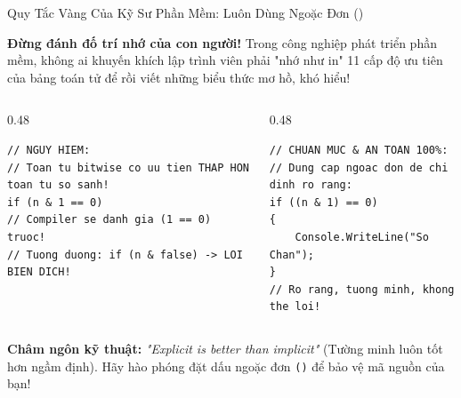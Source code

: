 \documentclass[aspectratio=169, 10pt]{beamer}
\begin{document}
\begin{frame}[fragile]{Quy Tắc Vàng Của Kỹ Sư Phần Mềm: Luôn Dùng Ngoặc Đơn ()}
  \begin{alertblock}{\textbf{Đừng đánh đố trí nhớ của con người!}}
    Trong công nghiệp phát triển phần mềm, không ai khuyến khích lập trình viên phải "nhớ như in" 11 cấp độ ưu tiên của bảng toán tử để rồi viết những biểu thức mơ hồ, khó hiểu!
  \end{alertblock}

  \begin{columns}[T]
    \begin{column}{0.48\textwidth}
      \begin{tcolorbox}[colback=AlertRed!10,colframe=AlertRed,title=\textbf{Biểu thức thiếu ngoặc (Code Smell - Dễ lỗi)},fonttitle=\small\bfseries]
\begin{lstlisting}[numbers=none]
// NGUY HIEM:
// Toan tu bitwise co uu tien THAP HON toan tu so sanh!
if (n & 1 == 0) 
// Compiler se danh gia (1 == 0) truoc!
// Tuong duong: if (n & false) -> LOI BIEN DICH!
\end{lstlisting}
      \end{tcolorbox}
    \end{column}

    \begin{column}{0.48\textwidth}
      \begin{tcolorbox}[colback=UniGreen!10,colframe=UniGreen,title=\textbf{Biểu thức dùng ngoặc đơn (Chuẩn mực)},fonttitle=\small\bfseries]
\begin{lstlisting}[numbers=none]
// CHUAN MUC & AN TOAN 100%:
// Dung cap ngoac don de chi dinh ro rang:
if ((n & 1) == 0) 
{
    Console.WriteLine("So Chan");
}
// Ro rang, tuong minh, khong the loi!
\end{lstlisting}
      \end{tcolorbox}
    \end{column}
  \end{columns}

  \vspace{2mm}
  \begin{exampleblock}{\textbf{Châm ngôn kỹ thuật:}}
    \textit{"Explicit is better than implicit"} (Tường minh luôn tốt hơn ngầm định). Hãy hào phóng đặt dấu ngoặc đơn \texttt{()} để bảo vệ mã nguồn của bạn!
  \end{exampleblock}
\end{frame}
\end{document}
